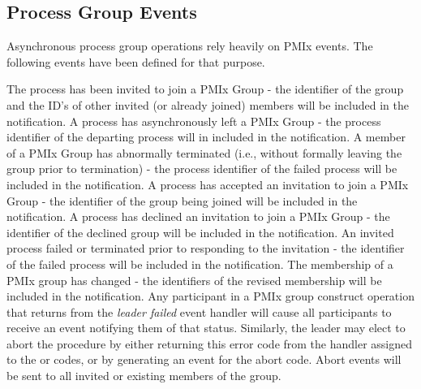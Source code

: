 \subsection{Process Group Events}

Asynchronous process group operations rely heavily on \ac{PMIx} events.  The following events have been defined for that purpose.

\begin{constantdesc}
%
The process has been invited to join a \ac{PMIx} Group - the identifier of the group and the ID's of other invited (or already joined) members will be included in the notification.
%
A process has asynchronously left a \ac{PMIx} Group - the process identifier of the departing process will in included in the notification.
%
A member of a \ac{PMIx} Group has abnormally terminated (i.e., without formally leaving the group prior to termination) - the process identifier of the failed process will be included in the notification.
%
A process has accepted an invitation to join a \ac{PMIx} Group - the identifier of the group being joined will be included in the notification.
%
A process has declined an invitation to join a \ac{PMIx} Group - the identifier of the declined group will be included in the notification.
%
An invited process failed or terminated prior to responding to the invitation - the identifier of the failed process will be included in the notification.
%
The membership of a \ac{PMIx} group has changed - the identifiers of the revised membership will be included in the notification.
%
Any participant in a \ac{PMIx} group construct operation that returns  from the \emph{leader failed} event handler will cause all participants to receive an event notifying them of that status. Similarly, the leader may elect to abort the procedure by either returning this error code from the handler assigned to the  or  codes, or by generating an event for the abort code. Abort events will be sent to all invited or existing members of the group.
%

\end{constantdesc}
